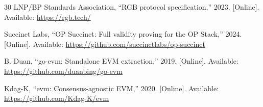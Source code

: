 \documentclass[11pt,twocolumn]{article}
\begin{document}
\begin{thebibliography}{30}
LNP/BP Standards Association, ``RGB protocol specification,'' 2023. [Online]. Available: \url{https://rgb.tech/}

Succinct Labs, ``OP Succinct: Full validity proving for the OP Stack,'' 2024. [Online]. Available: \url{https://github.com/succinctlabs/op-succinct}

B. Duan, ``go-evm: Standalone EVM extraction,'' 2019. [Online]. Available: \url{https://github.com/duanbing/go-evm}

Kdag-K, ``evm: Consensus-agnostic EVM,'' 2020. [Online]. Available: \url{https://github.com/Kdag-K/evm}

\end{thebibliography}
\end{document}

